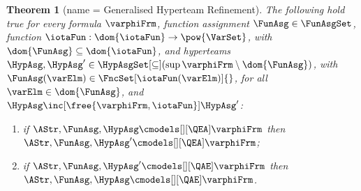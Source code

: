 \documentclass[authoryear]{elsarticle}
\newtheorem{theorem}{Theorem}
\begin{document}
\begin{theorem}[name = Generalised Hyperteam Refinement]
  \label{thm:hyprefMeta}
%
  The following hold true for every \Meta formula $\varphiFrm$, function
  assignment $\FunAsg \in \FunAsgSet$, function $\iotaFun : \dom{\iotaFun} \to
  \pow{\VarSet}$, with $\dom{\FunAsg} \subseteq \dom{\iotaFun}$,
%
  and hyperteams $\HypAsg, \HypAsg' \in \HypAsgSet[\subseteq](\sup{\varphiFrm}
  \setminus \dom{\FunAsg})$, with $\FunAsg(\varElm) \in
  \FncSet[\iotaFun(\varElm)]{}$, for all $\varElm \in \dom{\FunAsg}$, and
  ${\HypAsg \inc[\free{\varphiFrm,\iotaFun}] \HypAsg'}$:
  \begin{enumerate}[1)]
  \item
    if $\AStr, \FunAsg, \HypAsg \cmodels[][\QEA] \varphiFrm$ then $\AStr,
    \FunAsg, \HypAsg' \cmodels[][\QEA] \varphiFrm$;
  \item
    if $\AStr, \FunAsg, \HypAsg' \cmodels[][\QAE] \varphiFrm$ then $\AStr,
    \FunAsg, \HypAsg \cmodels[][\QAE] \varphiFrm$.
  \end{enumerate}
\end{theorem}
\end{document}
